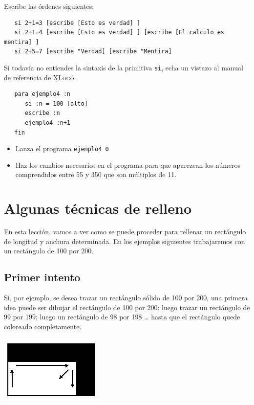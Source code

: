 \documentclass[12pt,twoside,spanish,a4paper]{report}
\begin{document}
Escribe las \'ordenes siguientes:
\begin{verbatim}
   si 2+1=3 [escribe [Esto es verdad] ]
   si 2+1=4 [escribe [Esto es verdad] ] [escribe [El calculo es mentira] ]
   si 2+5=7 [escribe "Verdad] [escribe "Mentira] \end{verbatim}
Si todav\'ia no entiendes la sintaxis de la primitiva \texttt{si}, echa
un vistazo al manual de referencia de \textsc{XLogo}.
\begin{verbatim}
   para ejemplo4 :n
      si :n = 100 [alto]
      escribe :n
      ejemplo4 :n+1
   fin \end{verbatim}
\begin{itemize}
   \item Lanza el programa \texttt{ejemplo4 0}
   \item Haz los cambios necesarios en el programa para que aparezcan los n\'umeros
      comprendidos entre 55 y 350 que son m\'ultiplos de 11.
\end{itemize}

\newpage{}

\chapter{Algunas t\'ecnicas de relleno}
    \label{sec:Tecnicas-Relleno}

En esta lecci\'on, vamos a ver como se puede proceder para rellenar
un rect\'angulo de longitud y anchura determinada. En los ejemplos
siguientes trabajaremos con un rect\'angulo de 100 por 200.

\section{Primer intento}
   \label{sub:Primer-intento}

% 
\noindent Si, por ejemplo, se desea trazar un rect\'angulo s\'olido de 100
por 200, una primera idea puede ser dibujar el rect\'angulo de 100 por 200:
luego trazar un rect\'angulo de 99 por 199; luego un rect\'angulo de 98 por
198 \ldots{} hasta que el rect\'angulo quede coloreado completamente.
\begin{center}
   \includegraphics[scale=0.75]{Imagenes_Tutorial/10_Recursividad_1}
\end{center}
\end{document}
